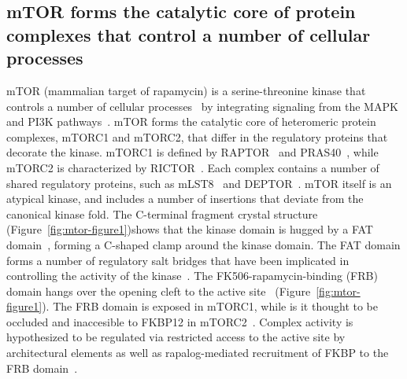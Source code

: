\documentclass[phd,tocprelim]{cornell}
\begin{document}
\subsection{mTOR forms the catalytic core of protein complexes that control a number of cellular processes}
mTOR (mammalian target of rapamycin) is a serine-threonine kinase that controls a number of cellular processes~\citep{Laplante:2012fm,Saxton:2017cv} by integrating signaling from the MAPK and PI3K pathways~\citep{Mendoza2011-bj}. mTOR forms the catalytic core of heteromeric protein complexes, mTORC1 and mTORC2, that differ in the regulatory proteins that decorate the kinase. mTORC1 is defined by RAPTOR~\citep{Kim:2002vh,Hara:2002tn} and PRAS40~\citep{Yang:2017gu}, while mTORC2 is characterized by RICTOR~\citep{Sarbassov:2004kv}. Each complex contains a number of shared regulatory proteins, such as mLST8~\cite{BarPeled:2012gq} and DEPTOR~\citep{Peterson:2009fc}. mTOR itself is an atypical kinase, and includes a number of insertions that deviate from the canonical kinase fold. The C-terminal fragment crystal structure (Figure~\ref{fig:mtor-figure1})shows that the kinase domain is hugged by a FAT domain~\citep{Yang:2013gaa}, forming a C-shaped clamp around the kinase domain. The FAT domain forms a number of regulatory salt bridges that have been implicated in controlling the activity of the kinase~\cite{Yang:2013gaa}. The FK506-rapamycin-binding (FRB) domain hangs over the opening cleft to the active site~\cite{Yang:2013gaa} (Figure~\ref{fig:mtor-figure1}). The FRB domain is exposed in mTORC1, while is it thought to be occluded and inaccesible to FKBP12 in mTORC2~\citep{Gaubitz:2015gr}. Complex activity is hypothesized to be regulated via restricted access to the active site by architectural elements as well as rapalog-mediated recruitment of FKBP to the FRB domain~\citep{Aylett:2016gs}. 
\end{document}
